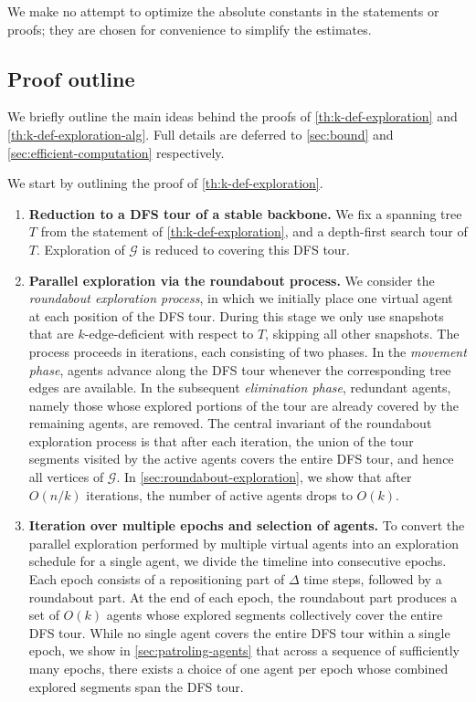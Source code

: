 \documentclass[a4paper,11pt]{article}
\theoremstyle{definition}
\theoremstyle{remark}
\newcommand{\cG}{\ensuremath{\mathcal{G}}}
\begin{document}
    We make no attempt to optimize the absolute constants in the statements or proofs; they are chosen for convenience to simplify the estimates.
	\subsection{Proof outline}
    
    We briefly outline the main ideas behind the proofs of \cref{th:k-def-exploration} and \cref{th:k-def-exploration-alg}. Full details are deferred to \cref{sec:bound} and \cref{sec:efficient-computation} respectively.

    We start by outlining the proof of \cref{th:k-def-exploration}.
    \begin{enumerate}[label=\arabic*.]
        \item \textbf{Reduction to a DFS tour of a stable backbone.}  
        We fix a spanning tree $T$ from the statement of \cref{th:k-def-exploration}, and a depth-first search tour of $T$. Exploration of $\cG$ is reduced to covering this DFS tour.

        \item \textbf{Parallel exploration via the roundabout process.}
        We consider the \emph{roundabout exploration process}, in which we initially place one virtual agent at each position of the DFS tour.
        During this stage we only use snapshots that are $k$-edge-deficient with respect to $T$, skipping all other snapshots.
        The process proceeds in iterations, each consisting of two phases. In the \emph{movement phase}, agents advance along the DFS tour whenever the corresponding tree edges are available. In the subsequent \emph{elimination phase}, redundant agents, namely those whose explored portions of the tour are already covered by the remaining agents, are removed.
        The central invariant of the roundabout exploration process is that after each iteration, the union of the tour segments visited by the active agents covers the entire DFS tour, and hence all vertices of $\cG$.
        In \cref{sec:roundabout-exploration}, we show that after $O(n/k)$ iterations, the number of active agents drops to $O(k)$.

        \item \textbf{Iteration over multiple epochs and selection of agents.}  
        To convert the parallel exploration performed by multiple virtual agents into an exploration schedule for a single agent, we divide the timeline into consecutive epochs. Each epoch consists of a repositioning part of $\Delta$ time steps, followed by a roundabout part. At the end of each epoch, the roundabout part produces a set of $O(k)$ agents whose explored segments collectively cover the entire DFS tour.
        While no single agent covers the entire DFS tour within a single epoch, we show in \cref{sec:patroling-agents} that across a sequence of sufficiently many epochs, there exists a choice of one agent per epoch whose combined explored segments span the DFS tour.


\end{enumerate}
\end{document}
